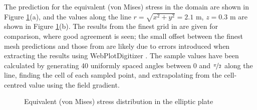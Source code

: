 \documentclass[sn-mathphys,Numbered]{sn-jnl}%
\begin{document}
The prediction for the equivalent (von Mises) stress in the domain are shown in Figure \ref{fig:elliptic_plate_sigmaEq}(a), and the values along the line $r = \sqrt{x^2 + y^2} = 2.1$ m, $z = 0.3$ m are shown in Figure \ref{fig:elliptic_plate_sigmaEq}(b).
The results from the finest grid in \citet{Demirdzic1997a} are given for comparison, where good agreement is seen;
the small offset between the finest mesh predictions and those from \citet{Demirdzic1997a} are likely due to errors introduced when extracting the \citet{Demirdzic1997a} results using WebPlotDigitizer \citep{WebPlotDigitizer}.
The sample values have been calculated by generating 40 uniformly spaced angles between 0 and $\nicefrac{\pi}{2}$ along the line, finding the cell of each sampled point, and extrapolating from the cell-centred value using the field gradient.
\begin{figure}[htbp]
   \centering
   \caption{Equivalent (von Mises) stress distribution in the elliptic plate}
   \label{fig:elliptic_plate_sigmaEq}
\end{figure}
\end{document}
